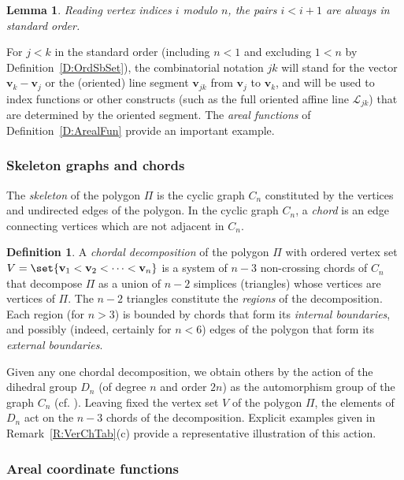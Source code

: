 \documentclass[12pt]{amsart}
\theoremstyle{plain}
\newtheorem{lemma}[theorem]{Lemma}
\theoremstyle{definition}
\newtheorem{definition}[theorem]{Definition}
\numberwithin{equation}{section}
\begin{document}
\begin{lemma}\label{L:AdVxPair}
Reading vertex indices $i$ modulo $n$, the pairs $i<i+1$ are always in standard order.
\end{lemma}


For $j<k$ in the standard order (including $n<1$ and excluding $1<n$ by Definition~\ref{D:OrdSbSet}), the combinatorial notation $jk$ will stand for the vector $\mathbf v_k-\mathbf v_j$ or the (oriented) line segment $\mathbf v_{jk}$ from $\mathbf v_j$ to $\mathbf v_k$, and will be used to index functions or other constructs (such as the full oriented affine line $\mathcal L_{jk}$) that are determined by the oriented segment. The \emph{areal functions} of Definition~\ref{D:ArealFun} provide an important example.


\subsubsection{Skeleton graphs and chords}\label{SSS:SkGrChrd}


The \emph{skeleton} of the polygon $\Pi$ is the cyclic graph $C_n$ constituted by the vertices and undirected edges of the polygon. In the cyclic graph $C_n$, a \emph{chord} is an edge connecting vertices which are not adjacent in $C_n$.

\begin{definition}\label{D:SkGrChrd}
A \emph{chordal decomposition} of the polygon $\Pi$ with ordered vertex set $V=\set{\mathbf v_1<\mathbf v_2<\dots<\mathbf v_n}$ is a system of $n-3$ non-crossing chords of $C_n$ that decompose $\Pi$ as a union of $n-2$ simplices (triangles) whose vertices are vertices of $\Pi$. The $n-2$ triangles constitute the \emph{regions} of the decomposition. Each region (for $n>3$) is bounded by chords that form its \emph{internal boundaries}, and possibly (indeed, certainly for $n<6$) edges of the polygon that form its \emph{external boundaries}.
\end{definition}

Given any one chordal decomposition, we obtain others by the action of the dihedral group $D_n$ (of degree $n$ and order $2n$) as the automorphism group of the graph $C_n$ (cf. \cite{BowReg}). Leaving fixed the vertex set $V$ of the polygon $\Pi$, the elements of $D_n$ act on the $n-3$ chords of the decomposition. Explicit examples given in Remark~\ref{R:VerChTab}(c) provide a representative illustration of this action.


\subsubsection{Areal coordinate functions}\label{SSS:ArCordFun}
\end{document}
